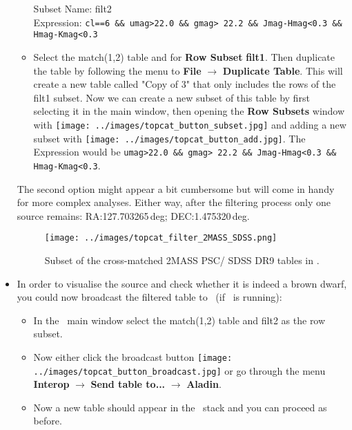 \documentclass [a4paper, 12pt]{article}
\begin{document}
\begin{itemize}
\begin{itemize}
        Subset Name: filt2\\
        Expression: \texttt{cl==6 \&\& umag>22.0 \&\& gmag> 22.2 \&\&
        Jmag-Hmag<0.3 \&\& Hmag-Kmag<0.3}\\
        \item Select the match(1,2) table and for \textbf{Row Subset}
        \textbf{filt1}. Then duplicate the table by following the menu to
        \textbf{File} $\rightarrow$ \textbf{Duplicate Table}. This will create
        a new table called "Copy of 3" that only includes the rows of the filt1
        subset. Now we can create a new subset of this table by first selecting
        it in the main window, then opening the \textbf{Row Subsets} window
        with \texttt{[image: ../images/topcat\_button\_subset.jpg]} and adding a new subset
        with
        \texttt{[image: ../images/topcat\_button\_add.jpg]}. The Expression would be
        \texttt{umag>22.0 \&\& gmag> 22.2 \&\& Jmag-Hmag<0.3 \&\&
        Hmag-Kmag<0.3}.
    \end{itemize}
    The second option might appear a bit cumbersome but will come in handy for
    more complex analyses. Either way, after the filtering process only one
    source remains: RA:127.703265\,deg; DEC:1.475320\,deg.
    \begin{figure}[H]
        \center
        \texttt{[image: ../images/topcat\_filter\_2MASS\_SDSS.png]}
        \caption{Subset of the cross-matched 2MASS PSC/ SDSS DR9 tables in
            \topcat. }
        \label{fig:filtering_topcat}
    \end{figure}
    \item In order to visualise the source and check whether it is indeed a
    brown dwarf, you could now broadcast the filtered table to \aladin\ (if
    \aladin\ is running):
    \begin{itemize}
        \item In the \topcat\ main window select the match(1,2) table and filt2
        as the row subset.
        \item Now either click the broadcast button
        \texttt{[image: ../images/topcat\_button\_broadcast.jpg]} or go through the
        menu
        \textbf{Interop} $\rightarrow$ \textbf{Send table to... } $\rightarrow$
        \textbf{Aladin}.
        \item Now a new table should appear in the \aladin\ stack and you can
        proceed as before.
    \end{itemize}
\end{itemize}
\end{document}
